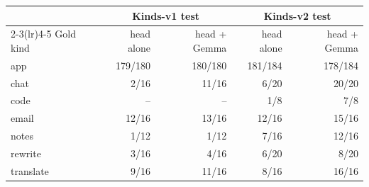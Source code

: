 \begin{tabular}{lrrrr}
\toprule
 & \multicolumn{2}{c}{Kinds-v1 test} & \multicolumn{2}{c}{Kinds-v2 test} \\
\cmidrule(lr){2-3}\cmidrule(lr){4-5}
Gold kind & head alone & head + Gemma & head alone & head + Gemma \\
\midrule
app & 179/180 & 180/180 & 181/184 & 178/184 \\
chat & 2/16 & 11/16 & 6/20 & 20/20 \\
code & -- & -- & 1/8 & 7/8 \\
email & 12/16 & 13/16 & 12/16 & 15/16 \\
notes & 1/12 & 1/12 & 7/16 & 12/16 \\
rewrite & 3/16 & 4/16 & 6/20 & 8/20 \\
translate & 9/16 & 11/16 & 8/16 & 16/16 \\
\bottomrule
\end{tabular}
